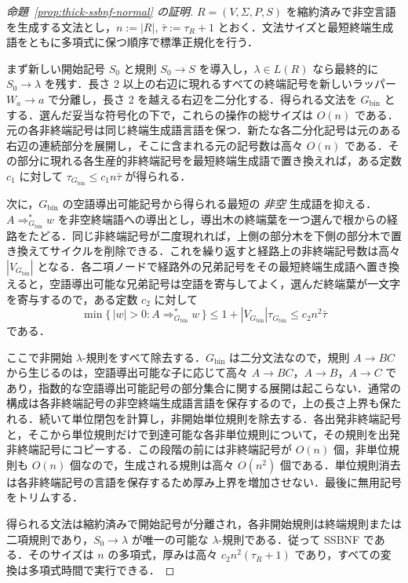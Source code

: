 \documentclass[11pt,a4paper]{ltjsarticle}
\theoremstyle{remark}
\theoremstyle{plain}
\begin{document}
\begin{proof}[命題~\ref{prop:thick-ssbnf-normal} の証明]
$R=(V,\Sigma,P,S)$ を縮約済みで非空言語を生成する文法とし，$n:=|R|$, $\bar\tau:=\tau_R+1$ とおく．文法サイズと最短終端生成語をともに多項式に保つ順序で標準正規化を行う．

まず新しい開始記号 $S_0$ と規則 $S_0\to S$ を導入し，$\lambda\in L(R)$ なら最終的に $S_0\to\lambda$ を残す．長さ 2 以上の右辺に現れるすべての終端記号を新しいラッパー $W_a\to a$ で分離し，長さ 2 を越える右辺を二分化する．得られる文法を $G_{\mathrm{bin}}$ とする．選んだ妥当な符号化の下で，これらの操作の総サイズは $O(n)$ である．元の各非終端記号は同じ終端生成語言語を保つ．新たな各二分化記号は元のある右辺の連続部分を展開し，そこに含まれる元の記号数は高々 $O(n)$ である．その部分に現れる各生産的非終端記号を最短終端生成語で置き換えれば，ある定数 $c_1$ に対して
$\tau_{G_{\mathrm{bin}}}\le c_1 n\bar\tau$
が得られる．

次に，$G_{\mathrm{bin}}$ の空語導出可能記号から得られる最短の \emph{非空} 生成語を抑える．$A\Rightarrow_{G_{\mathrm{bin}}}^*w$ を非空終端語への導出とし，導出木の終端葉を一つ選んで根からの経路をたどる．同じ非終端記号が二度現れれば，上側の部分木を下側の部分木で置き換えてサイクルを削除できる．これを繰り返すと経路上の非終端記号数は高々 $|V_{G_{\mathrm{bin}}}|$ となる．各二項ノードで経路外の兄弟記号をその最短終端生成語へ置き換えると，空語導出可能な兄弟記号は空語を寄与してよく，選んだ終端葉が一文字を寄与するので，ある定数 $c_2$ に対して
\[
 \min\{\,|w|>0:A\Rightarrow_{G_{\mathrm{bin}}}^*w\,\}
 \le 1+|V_{G_{\mathrm{bin}}}|\tau_{G_{\mathrm{bin}}}
 \le c_2 n^2\bar\tau
\]
である．

ここで非開始 $\lambda$-規則をすべて除去する．$G_{\mathrm{bin}}$ は二分文法なので，規則 $A\to BC$ から生じるのは，空語導出可能な子に応じて高々 $A\to BC$，$A\to B$，$A\to C$ であり，指数的な空語導出可能記号の部分集合に関する展開は起こらない．通常の構成は各非終端記号の非空終端生成語言語を保存するので，上の長さ上界も保たれる．続いて単位閉包を計算し，非開始単位規則を除去する．各出発非終端記号と，そこから単位規則だけで到達可能な各非単位規則について，その規則を出発非終端記号にコピーする．この段階の前には非終端記号が $O(n)$ 個，非単位規則も $O(n)$ 個なので，生成される規則は高々 $O(n^2)$ 個である．単位規則消去は各非終端記号の言語を保存するため厚み上界を増加させない．最後に無用記号をトリムする．

得られる文法は縮約済みで開始記号が分離され，各非開始規則は終端規則または二項規則であり，$S_0\to\lambda$ が唯一の可能な $\lambda$-規則である．従って SSBNF である．そのサイズは $n$ の多項式，厚みは高々 $c_2n^2(\tau_R+1)$ であり，すべての変換は多項式時間で実行できる．
\end{proof}
\end{document}
